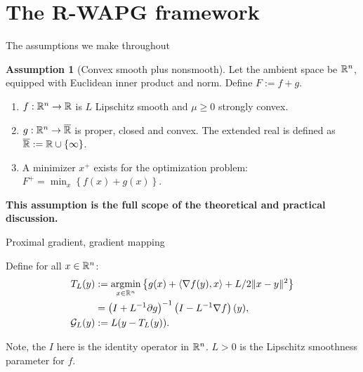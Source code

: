 \documentclass[11pt]{beamer}
\theoremstyle{definition}
\newtheorem{assumption}{Assumption}[section]
\begin{document}
\section{The R-WAPG framework}
    \begin{frame}{The assumptions we make throughout}
        \begin{assumption}[Convex smooth plus nonsmooth]
            Let the ambient space be $\mathbb R^n$, equipped with Euclidean inner product and norm. 
            Define $F := f + g$.
            \begin{enumerate}
                \item $f: \mathbb R^n \rightarrow \mathbb R$ is $L$ Lipschitz smooth and $\mu \ge 0$ strongly convex.
                \item $g: \mathbb R^n \rightarrow \overline {\mathbb R}$ is proper, closed and convex. The extended real is defined as $\overline {\mathbb R} := \mathbb R \cup \{\infty\}$.
                \item A minimizer $x^+$ exists for the optimization problem: $F^+ = \min_x \left\lbrace f(x) + g(x)\right\rbrace$.
            \end{enumerate}
        \end{assumption}
        \textbf{This assumption is the full scope of the theoretical and practical discussion. }
    \end{frame}
    \begin{frame}{Proximal gradient, gradient mapping}
        \begin{definition}
            Define for all $x\in \mathbb R^n$: 
            \begin{align*}
                T_L(y) 
                &:= \mathop{\rm argmin}\limits_{x \in \mathbb R^n} \left\lbrace
                    g(x) + \langle \nabla f(y), x\rangle + L/2\Vert x - y\Vert^2
                \right\rbrace 
                \\
                &= \left(I + L^{-1}\partial g\right)^{-1}
                \left(I - L^{-1}\nabla f\right)(y),
                \\
                \mathcal G_L(y)
                &:= L(y - T_L(y)).
            \end{align*}
        \end{definition}
        Note, the $I$ here is the identity operator in $\mathbb R^n$. 
        $L > 0$ is the Lipschitz smoothness parameter for $f$. 
    \end{frame}
\end{document}
